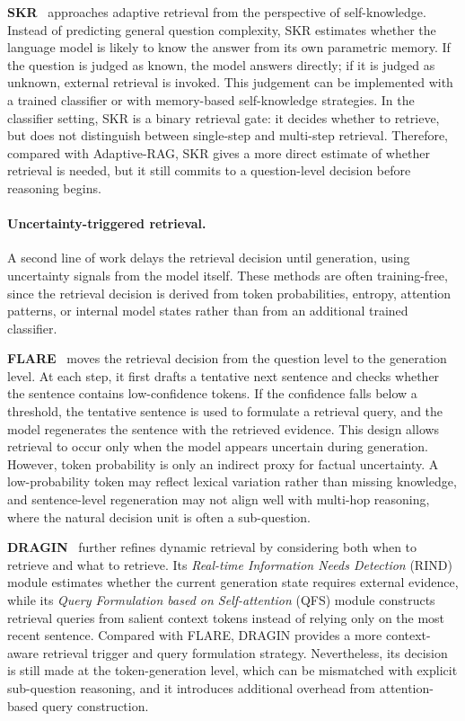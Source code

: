 \textbf{SKR}~\cite{skr} approaches adaptive retrieval from the perspective of self-knowledge. Instead of predicting general question complexity, SKR estimates whether the language model is likely to know the answer from its own parametric memory. If the question is judged as known, the model answers directly; if it is judged as unknown, external retrieval is invoked. This judgement can be implemented with a trained classifier or with memory-based self-knowledge strategies. In the classifier setting, SKR is a binary retrieval gate: it decides whether to retrieve, but does not distinguish between single-step and multi-step retrieval. Therefore, compared with Adaptive-RAG, SKR gives a more direct estimate of whether retrieval is needed, but it still commits to a question-level decision before reasoning begins.


\paragraph{Uncertainty-triggered retrieval.}

A second line of work delays the retrieval decision until generation, using uncertainty signals from the model itself. These methods are often training-free, since the retrieval decision is derived from token probabilities, entropy, \mbox{attention} patterns, or internal model states rather than from an additional trained classifier.

\textbf{FLARE}~\cite{flare} moves the retrieval decision from the question level to the generation level. At each step, it first drafts a tentative next sentence and checks whether the sentence contains low-confidence tokens. If the confidence falls below a threshold, the tentative sentence is used to formulate a retrieval query, and the model regenerates the sentence with the retrieved evidence. This design allows retrieval to occur only when the model appears uncertain during generation. However, token probability is only an indirect proxy for factual uncertainty. A low-probability token may reflect lexical variation rather than missing knowledge, and sentence-level regeneration may not align well with multi-hop reasoning, where the natural decision unit is often a sub-question.

\textbf{DRAGIN}~\cite{dragin} further refines dynamic retrieval by considering both when to retrieve and what to retrieve. Its \emph{Real-time Information Needs Detection} (RIND) module estimates whether the current generation state requires external evidence, while its \emph{Query \mbox{Formulation} based on Self-attention} (QFS) module constructs retrieval queries from salient \mbox{context} tokens instead of relying only on the most recent sentence. Compared with FLARE, DRAGIN provides a more context-aware retrieval trigger and query formulation strategy. Nevertheless, its decision is still made at the token-generation level, which can be mismatched with explicit sub-question reasoning, and it introduces additional overhead from attention-based query construction.

